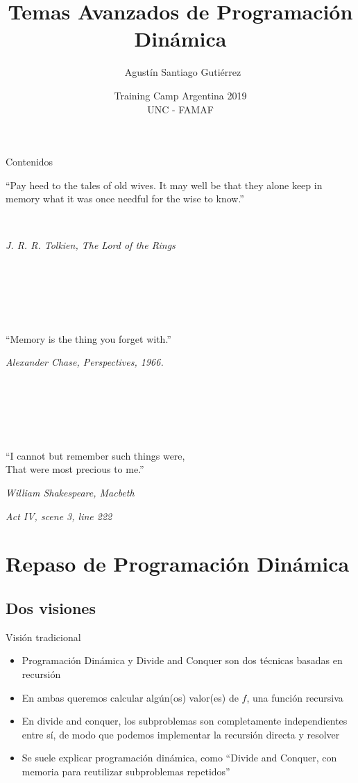 \documentclass{beamer}
\title[DP Avanzada] %
{Temas Avanzados de Programación Dinámica}
\author[Agustín Gutiérrez] %
{~Agustín Santiago Gutiérrez}
\institute[UBA] %
{
  Facultad de Ciencias Exactas y Naturales\\
  Universidad de Buenos Aires
}
\date[TC 2019] %
{Training Camp Argentina 2019\\
 UNC - FAMAF}
\begin{document}
\begin{frame}
  \titlepage
\end{frame}

\begin{frame}{Contenidos}
  \tableofcontents
\end{frame}

\begin{frame}
  ``Pay heed to the tales of old wives. It may well be that they alone keep in memory what it was once needful for the wise to know.''
  
  \ 
  
  \hfill \textit{J. R. R. Tolkien, The Lord of the Rings}

  \ 
  
  \ 
  
  \ 

``Memory is the thing you forget with.''


  \hfill \textit{Alexander Chase, Perspectives, 1966.}


  \ 
  
  \ 
  
  \ 

``I cannot but remember such things were, \\That were most precious to me.''

  \hfill \textit{William Shakespeare, Macbeth}
  
  \hfill \textit{Act IV, scene 3, line 222}
\end{frame}





\section{Repaso de Programación Dinámica}

\subsection{Dos visiones}

\begin{frame}{Visión tradicional}
	\begin{itemize}
		\item Programación Dinámica y Divide and Conquer son dos técnicas basadas en recursión
		\item En ambas queremos calcular algún(os) valor(es) de $f$, una función recursiva
		\item En divide and conquer, los subproblemas son completamente independientes entre sí, de modo que podemos implementar la recursión directa y resolver
		\item Se suele explicar programación dinámica, como ``Divide and Conquer, con memoria para reutilizar subproblemas repetidos''
	\end{itemize}
\end{frame}
\end{document}
